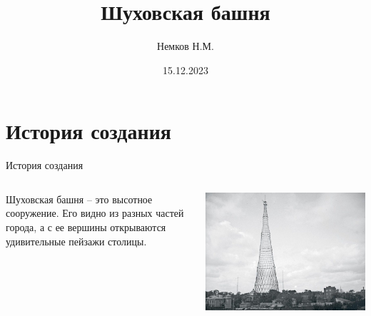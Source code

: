 

\title{Шуховская башня}
\author{Немков Н.М.}
\date{15.12.2023}



\begin{frame}
\maketitle
\end{frame}


\section{История создания}
\begin{frame}{История создания}
	\begin{columns}
		\begin{column}{0.45\textwidth}

			Шуховская башня – это высотное сооружение. Его видно из разных частей города, а с ее вершины открываются удивительные пейзажи столицы.

		\end{column}


		\begin{column}{0.45\textwidth}

			\includegraphics[width=1\textwidth]{images/tower-1}

		\end{column}
	\end{columns}
\end{frame}


